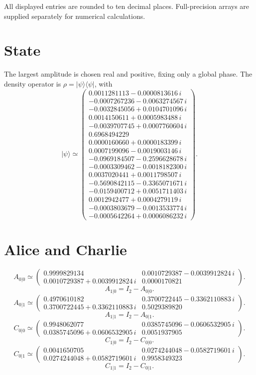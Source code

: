 \documentclass[11pt]{article}
\begin{document}
All displayed entries are rounded to ten decimal places. Full-precision
arrays are supplied separately for numerical calculations.
\section{State}
The largest amplitude is chosen real and positive, fixing only a global
phase. The density operator is $\rho=|\psi\rangle\langle\psi|$, with
\[
|\psi\rangle\simeq
\begin{pmatrix}
0.0011281113-0.0000813616\,i \\
-0.0007267236-0.0063274567\,i \\
-0.0032845056+0.0104701096\,i \\
0.0014150611+0.0005983488\,i \\
-0.0039707745+0.0007760604\,i \\
0.6968494229 \\
0.0000160660+0.0000183399\,i \\
0.0007199096-0.0019003146\,i \\
-0.0969184507-0.2596628678\,i \\
-0.0003309462-0.0018182300\,i \\
0.0037020441+0.0011798507\,i \\
-0.5690842115-0.3365071671\,i \\
-0.0159400712+0.0051711403\,i \\
0.0012942477+0.0004279119\,i \\
-0.0003803679-0.0013533774\,i \\
-0.0005642264+0.0006086232\,i
\end{pmatrix}.
\]
\section{Alice and Charlie}
\[
A_{0|0}\simeq \begin{pmatrix}
0.9999829134 & 0.0010729387-0.0039912824\,i \\
0.0010729387+0.0039912824\,i & 0.0000170821
\end{pmatrix}.
\]
\[
A_{1|0}=I_2-A_{0|0}.
\]
\[
A_{0|1}\simeq \begin{pmatrix}
0.4970610182 & 0.3700722445-0.3362110883\,i \\
0.3700722445+0.3362110883\,i & 0.5029389820
\end{pmatrix}.
\]
\[
A_{1|1}=I_2-A_{0|1}.
\]
\[
C_{0|0}\simeq \begin{pmatrix}
0.9948062077 & 0.0385745096-0.0606532905\,i \\
0.0385745096+0.0606532905\,i & 0.0051937905
\end{pmatrix}.
\]
\[
C_{1|0}=I_2-C_{0|0}.
\]
\[
C_{0|1}\simeq \begin{pmatrix}
0.0041650705 & 0.0274244048-0.0582719601\,i \\
0.0274244048+0.0582719601\,i & 0.9958349323
\end{pmatrix}.
\]
\[
C_{1|1}=I_2-C_{0|1}.
\]
\end{document}
